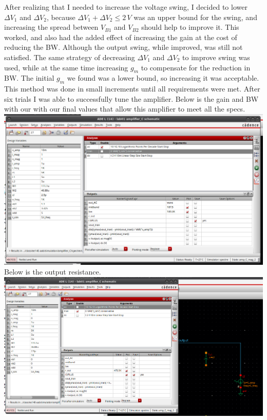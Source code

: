 \documentclass[12pt, fleqn]{article}
\begin{document}
\noindent
After realizing that I needed to increase the voltage swing, I decided to lower $\Delta V_1$ and $\Delta V_2$, because $\Delta V_1 + \Delta V_2 \leq 2\,V$ was an upper bound for the swing, and increasing the spread between $V_{B1}$ and $V_{B2}$ should help to improve it.  This worked, and also had the added effect of increasing the gain at the cost of reducing the BW.  Although the output swing, while improved, was still not satisfied.  The same strategy of decreasing $\Delta V_1$ and $\Delta V_2$ to improve swing was used, while at the same time increasing $g_m$ to compensate for the reduction in BW.  The initial $g_m$ we found was a lower bound, so increasing it was acceptable.  This method was done in small increments until all requirements were met.  After six trials I was able to successfully tune the amplifier.  
\newpage\noindent
Below is the gain and BW with our with our final values that allow this amplifier to meet all the specs.\\[0.1cm]
\includegraphics[scale=0.35, center]{c_gain_bw.png}\\[0.25cm]
Below is the output resistance.\\[0.1cm]
\includegraphics[scale=0.35, center]{c_rout.png}
\end{document}

